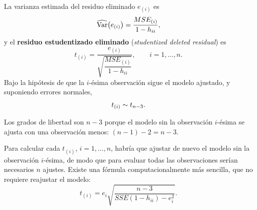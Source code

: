 \begin{definicion}
  La varianza estimada del residuo eliminado $e_{(i)}$ es
  \[
    \widehat{\operatorname{Var}}\big(e_{(i)}\big) = \frac{MSE_{(i)}}{1-h_{ii}},
  \]
  y el \textbf{residuo estudentizado eliminado} (\emph{studentized deleted residual}) es
  \[
    t_{(i)} = \frac{e_{(i)}}{\sqrt{\dfrac{MSE_{(i)}}{1-h_{ii}}}}, \qquad i=1,\ldots,n .
  \]
  Bajo la hipótesis de que la $i$-ésima observación sigue el modelo ajustado, y suponiendo
  errores normales,
  \[
    t_{(i)} \sim t_{n-3} .
  \]
\end{definicion}

Los grados de libertad son $n-3$ porque el modelo sin la observación $i$-ésima se ajusta con una
observación menos: $(n-1)-2=n-3$.

Para calcular cada $t_{(i)}$, $i=1,\ldots,n$, habría que ajustar de nuevo el modelo sin la
observación $i$-ésima, de modo que para evaluar todas las observaciones serían necesarios $n$
ajustes. Existe una fórmula computacionalmente más sencilla, que no requiere reajustar el
modelo:
\[
  t_{(i)} = e_i\sqrt{\frac{n-3}{SSE(1-h_{ii})-e_i^2}} .
\]
